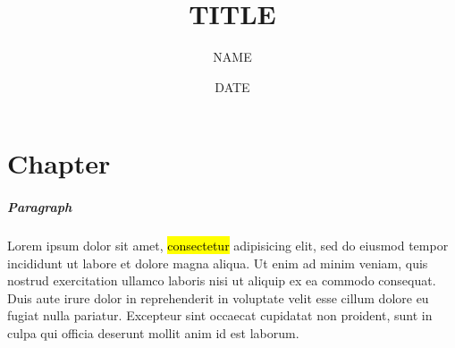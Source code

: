 \documentclass[a5paper, 10pt]{book}
\begin{document}
    	\linespread{1}
		\graphicspath{ {./img/} }
		\sloppy



	\title{TITLE}
	\def \subtitle {SUBTITLE}
	\author{NAME}
	\date{DATE}

	\BgUsefalse
	\BgFtrue

	\maketitle

	\BgFfalse

	\tableofcontents
	\listoffigures



		\renewcommand*\rmdefault{qag}
		\selectfont


	\chapter{Chapter}
	\BgUsetrue

	\paragraph{Paragraph} Lorem ipsum dolor sit amet, \hl{consectetur} adipisicing elit, sed do eiusmod tempor incididunt ut labore et dolore magna aliqua. Ut enim ad minim veniam, quis nostrud exercitation ullamco laboris nisi ut aliquip ex ea commodo consequat. Duis aute irure dolor in reprehenderit in voluptate velit esse cillum dolore eu fugiat nulla pariatur. Excepteur sint occaecat cupidatat non proident, sunt in culpa qui officia deserunt mollit anim id est laborum.
\end{document}
